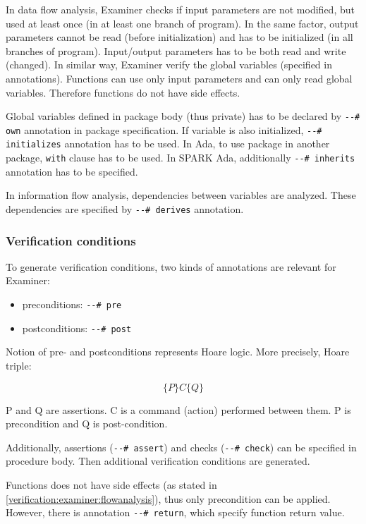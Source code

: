 In data flow analysis, Examiner checks if input parameters are not modified, but used at least once (in at least one branch of program). In the same factor, output parameters cannot be read (before initialization) and has to be initialized (in all branches of program). Input/output parameters has to be both read and write (changed). In similar way, Examiner verify the global variables (specified in annotations). Functions can use only input parameters and can only read global variables. Therefore functions do not have side effects. 

Global variables defined in package body (thus private) has to be declared by \lstinline{--# own} annotation in package specification. If variable is also initialized, \lstinline{--# initializes} annotation has to be used. In Ada, to use package in another package, \lstinline{with} clause has to be used. In SPARK Ada, additionally \lstinline{--# inherits} annotation has to be specified.

In information flow analysis, dependencies between variables are analyzed. These dependencies are specified by \lstinline{--# derives} annotation.


\subsubsection{Verification conditions}
\label{verification:examiner:vc}

To generate verification conditions, two kinds of annotations are relevant for Examiner:
\begin{itemize}
	\item preconditions: \lstinline{--# pre}
	\item postconditions: \lstinline{--# post}
\end{itemize}

Notion of pre- and postconditions represents Hoare logic. More precisely, Hoare triple: 

\begin{equation} \label{eq:hoare_triple}
	\{P\} C \{Q\}
\end{equation}

P and Q are assertions. C is a command (action) performed between them. P is precondition and Q is post-condition.

Additionally, assertions (\lstinline{--# assert}) and checks (\lstinline{--# check}) can be specified in procedure body. Then additional verification conditions are generated.

Functions does not have side effects (as stated in \ref{verification:examiner:flowanalysis}), thus only precondition can be applied. However, there is annotation \lstinline{--# return}, which specify function return value.

